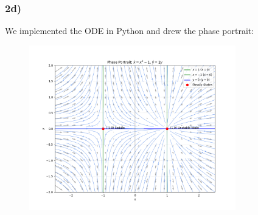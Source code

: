 \documentclass[]{scrartcl}
\begin{document}

\subsubsection*{2d)}

We implemented the ODE in Python and drew the phase portrait:

\begin{figure}[H]
    \centering
    \includegraphics[width=0.8\textwidth]{phase_portrait_2.png}
\end{figure}
\end{document}
